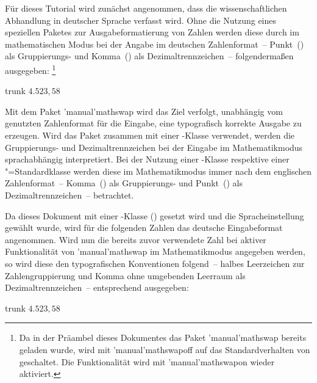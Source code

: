 \documentclass[%
  english,ngerman,%
  headings=small,%
]{tudscrartcl}
\begin{document}
\begin{Entity}{}

Für dieses Tutorial wird zunächst angenommen, dass die wissenschaftlichen 
Abhandlung in deutscher Sprache verfasst wird. Ohne die Nutzung eines 
speziellen Paketes zur Ausgabeformatierung von Zahlen werden diese durch 
 im mathematischen Modus bei der Angabe im deutschen 
Zahlenformat~-- Punkt~() als Gruppierungs- und Komma~(\PValue{,}) als 
Dezimaltrennzeichen~-- folgendermaßen ausgegeben:%
\footnote{%
  Da in der Präambel dieses Dokumentes das Paket \Package'manual'{mathswap} 
  bereits geladen wurde, wird mit \Macro'manual'{mathswapoff} auf das 
  Standardverhalten von  geschaltet. Die Funktionalität wird 
  mit \Macro'manual'{mathswapon} wieder aktiviert.%
}
%
\begin{Code}[input]{trunk}
\mathswapoff
\(4.523,58\)
\mathswapon

\end{Code}

Mit dem Paket \Package'manual'{mathswap} wird das Ziel verfolgt, unabhängig vom 
genutzten Zahlenformat für die Eingabe, eine typografisch korrekte Ausgabe zu 
erzeugen. Wird das Paket zusammen mit einer \TUDScript-Klasse verwendet, werden 
die Gruppierungs- und Dezimaltrennzeichen bei der Eingabe im Mathematikmodus 
sprachabhängig interpretiert. Bei der Nutzung einer \KOMAScript-Klasse 
respektive einer "=Standardklasse werden diese im 
Mathematikmodus immer nach dem englischen Zahlenformat~-- Komma~(\PValue{,}) 
als Gruppierungs- und Punkt~(\PValue{,}) als Dezimaltrennzeichen~-- betrachtet.

Da dieses Dokument mit einer \TUDScript-Klasse (\TUDClassName) gesetzt wird und 
die Spracheinstellung~ gewählt wurde, wird für die folgenden 
Zahlen das deutsche Eingabeformat angenommen. Wird nun die bereits zuvor 
verwendete Zahl bei aktiver Funktionalität von \Package'manual'{mathswap} im 
Mathematikmodus angegeben werden, so wird diese den typografischen Konventionen 
folgend~-- halbes Leerzeichen zur Zahlengruppierung und Komma ohne umgebenden 
Leerraum als Dezimaltrennzeichen~-- entsprechend ausgegeben:
%
\begin{Code}[input]{trunk}
\(4.523,58\)
\end{Code}


\end{Entity}
\end{document}
